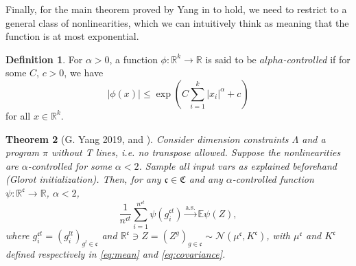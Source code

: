 \documentclass[11pt,notitlepage]{article}
\numberwithin{equation}{section}
\def\R{{\mathbb{R}}}
\def\normdist{\mathcal{N}}
\def\asconv{\stackrel{\text{a.s.}}{\longrightarrow}}
\newtheorem{theorem}{Theorem}[section]
\theoremstyle{remark}
\theoremstyle{definition}
\newtheorem{definition_body}[theorem]{Definition}
\newcommand{\definition}[1]{
	\theoremstyle{definition}
	\begin{definition_body}
		#1
	\end{definition_body}
	\theoremstyle{plain}
}
\begin{document}
	Finally, for the main theorem proved by Yang in \cite{yang2019scaling} to hold, we need to restrict to a general class of nonlinearities, which we can intuitively think as meaning that the function is at most exponential.
	
	\definition{
		For $\alpha > 0$, a function $\phi : \R^k \rightarrow \R$ is said to be \emph{$alpha$-controlled} if for some $C$, $c > 0$, we have
		\begin{equation}
		|\phi(x)| \leq \exp\left(C \sum_{i=1}^k|x_i|^\alpha + c \right)
		\end{equation}
		for all $x \in \R^k$.
	}
	
	\begin{theorem}[G. Yang 2019, \cite{yang2019scaling} and \cite{yang2019tensor}]\label{thm:yangMaster}
		Consider dimension constraints $\Lambda$ and a program $\pi$ without T lines, i.e. no transpose allowed. Suppose the nonlinearities are $\alpha$-controlled for some $\alpha <2$. Sample all input vars as explained beforehand (Glorot initialization). Then, for any $\mathfrak{c} \in \mathfrak{C}$ and any $\alpha$-controlled function $\psi : \R^{\mathfrak{c}} \rightarrow \R$, $\alpha < 2$,
		\begin{equation}
		\frac{1}{n^{\mathfrak{c}t}}\sum_{i=1}^{n^{\mathfrak{c}t}} \psi (g_i^{\mathfrak{c}t}) 
		\asconv \mathbb{E}\psi(Z),
		\end{equation}
		where $g^{\mathfrak{c}t}_i = (g^{lt}_i)_{g^l \in \mathfrak{c}}$ and $\R^{\mathfrak{c}} \ni Z = (Z^g)_{g \in \mathfrak{c}} \sim \normdist(\mu^{\mathfrak{c}}, K^{\mathfrak{c}})$, with $\mu^{\mathfrak{c}}$ and $K^{\mathfrak{c}}$ defined respectively in \eqref{eq:mean} and \eqref{eq:covariance}.
	\end{theorem}
	
\end{document}
